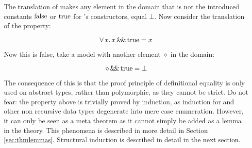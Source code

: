The translation of \hs{\&\&} makes any element in the domain that is not
the introduced constants $\mathrm{false}$ or $\mathrm{true}$ for 's
constructors, equal $\bot$. Now consider the translation of the
property:

\begin{equation*}
\forall \, x . \, x \, \mathrm{\&\!\&} \, \mathrm{true} = x
\end{equation*}

Now this is false, take a model with another element $\diamond$ in the
domain:

$$\diamond \, \mathrm{\&\!\&} \, \mathrm{true} = \bot$$

The consequence of this is that the proof principle of definitional
equality is only used on abstract types, rather than polymorphic, as
they cannot be strict. Do not fear: the property above is trivially
proved by induction, as induction for  and other non
recursive data types degenerate into mere case enumeration. However,
it can only be seen as a meta theorem as it cannot simply be added as
a lemma in the theory. This phenomena is described in more detail in
Section \ref{sec:thmlemmas}. Structural induction is described in
detail in the next section.


